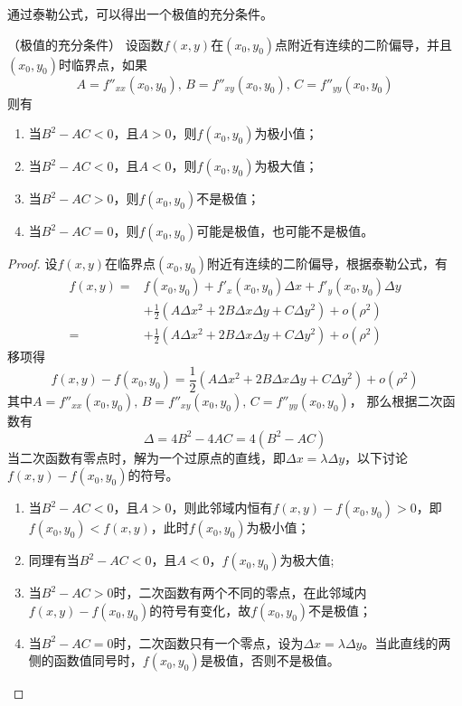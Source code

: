 通过泰勒公式，可以得出一个极值的充分条件。
\begin{theorem}
    （极值的充分条件）
    设函数$f(x,y)$在$(x_0,y_0)$点附近有连续的二阶偏导，并且$(x_0,y_0)$时临界点，如果
    \[ A = f''_{xx}(x_0,y_0),\, B = f''_{xy}(x_0,y_0),\, C = f''_{yy}(x_0,y_0) \]
    则有
    \begin{enumerate}[(1)]
        \item 当$B^2 - AC < 0$，且$A>0$，则$f(x_0,y_0)$为极小值；
        \item 当$B^2 - AC < 0$，且$A<0$，则$f(x_0,y_0)$为极大值；
        \item 当$B^2 - AC > 0$，则$f(x_0,y_0)$不是极值；
        \item 当$B^2 - AC = 0$，则$f(x_0,y_0)$可能是极值，也可能不是极值。
    \end{enumerate}
\end{theorem}
\begin{proof}
    设$f(x,y)$在临界点$(x_0,y_0)$附近有连续的二阶偏导，根据泰勒公式，有
    \begin{align*}
        f(x,y)
        = & f(x_0,y_0) + f'_x(x_0,y_0)\Delta x + f'_y(x_0,y_0)\Delta y                \\
          & + \frac{1}{2}(A\Delta x^2 + 2B\Delta x\Delta y + C\Delta y^2) + o(\rho^2) \\
        = & + \frac{1}{2}(A\Delta x^2 + 2B\Delta x\Delta y + C\Delta y^2) + o(\rho^2)
    \end{align*}
    移项得
    \[
        f(x,y) - f(x_0,y_0) = \frac{1}{2}(A\Delta x^2 + 2B\Delta x\Delta y + C\Delta y^2) + o(\rho^2)
    \]
    其中$ A = f''_{xx}(x_0,y_0),\, B = f''_{xy}(x_0,y_0),\, C = f''_{yy}(x_0,y_0)$，
    那么根据二次函数有
    \[ \Delta = 4B^2 - 4AC = 4(B^2 - AC) \]
    当二次函数有零点时，解为一个过原点的直线，即$\Delta x = \lambda \Delta y$，以下讨论$f(x,y)-f(x_0,y_0)$的符号。
    \begin{enumerate}[(1)]
        \item 当$B^2 - AC < 0$，且$A>0$，则此邻域内恒有$f(x,y)-f(x_0,y_0)>0$，即$f(x_0,y_0)<f(x,y)$，此时$f(x_0,y_0)$为极小值；
        \item 同理有当$B^2 - AC < 0$，且$A<0$，$f(x_0,y_0)$为极大值;
        \item 当$B^2 - AC > 0$时，二次函数有两个不同的零点，在此邻域内$f(x,y)-f(x_0,y_0)$的符号有变化，故$f(x_0,y_0)$不是极值；
        \item 当$B^2 - AC = 0$时，二次函数只有一个零点，设为$\Delta x =\lambda\Delta y$。当此直线的两侧的函数值同号时，$f(x_0,y_0)$是极值，否则不是极值。
    \end{enumerate}
\end{proof}


